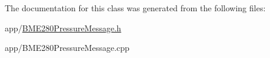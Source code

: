 The documentation for this class was generated from the following files\+:\begin{DoxyCompactItemize}
\item 
app/\hyperlink{_b_m_e280_pressure_message_8h}{B\+M\+E280\+Pressure\+Message.\+h}\item 
app/B\+M\+E280\+Pressure\+Message.\+cpp\end{DoxyCompactItemize}
